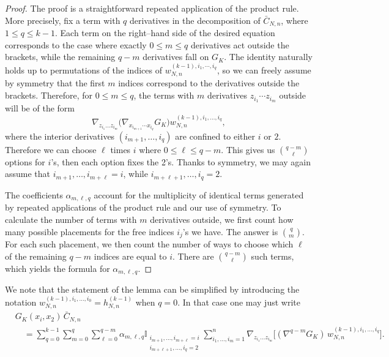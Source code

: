 \documentclass[pdflatex,sn-mathphys-num]{sn-jnl}
\theoremstyle{thmstyleone}%
\theoremstyle{thmstyletwo}%
\theoremstyle{thmstylethree}%
\begin{document}
\begin{proof}
The proof is a straightforward repeated application of the product rule.
More precisely, fix a term with \(q\) derivatives in the decomposition of \(\bar C_{N,n}\), where \(1\le q\le k-1\). Each term on the right--hand side of the desired equation corresponds to the case where exactly \(0\le m\le q\) derivatives act outside the brackets, while the remaining \(q-m\) derivatives fall on \(G_K\). The identity naturally holds up to permutations of the indices of
\(w_{N,n}^{(k-1),i_1,\cdots,i_q}\), so we can freely assume by symmetry that the first \(m\) indices correspond to the derivatives outside the brackets. Therefore, for \(0 \leq m \leq q\), the terms with \(m\) derivatives \(z_{i_{1}}\cdots z_{i_{m}}\) outside will be of the form
\[
\nabla_{z_{i_1}\dots z_{i_{m}}}\bigl(\nabla_{x_{i_{m+1}}\cdots x_{i_q}}G_K\bigr)
w_{N,n}^{(k-1),i_1,\dots,i_q},
\]
where the interior derivatives \((i_{m+1},\ldots,i_q)\) are confined to either \(i\) or \(2\). Therefore we can choose \(\ell\) times \(i\) where $0 \leq \ell \leq q-m$. This gives us $\binom{q-m}{\ell}$ options for $i$'s, then each option fixes the 2's. Thanks to symmetry, we may again assume that \(i_{m+1},\ldots,i_{m+\ell}=i\), while \(i_{m+\ell+1},\ldots,i_q=2\).

\noindent
The coefficients \(\alpha_{m,\ell,q}\) account for the multiplicity of identical terms generated by repeated applications of the product rule and our use of symmetry. To calculate the number of terms with \(m\) derivatives outside, we first count how many possible placements for the free indices \(i_j\)'s we have. The answer is \({q \choose m}\). For each such placement, we then count the number of ways to choose which \(\ell\) of the remaining \(q-m\) indices are equal to \(i\). There are \({q-m \choose \ell}\) such terms, which yields the formula for \(\alpha_{m,\ell,q}\).
\end{proof}
We note that the statement of the lemma can be simplified by introducing the notation $w^{(k-1),i_1,\ldots,i_0}_{N,n}=h_{N,n}^{(k-1)}$ when $q=0$. In that case one may just write     
%
\begin{align*}
& G_K(x_i,x_2)\,\bar{C}_{N,n}\\
&\quad =
\sum_{q=0}^{k-1} \sum_{m=0}^{q}\sum_{\ell=0}^{q-m} \alpha_{m,\ell,q} \mathbb{I}_{\substack{i_{m+1},\ldots, i_{m+\ell}=i \\ i_{m+\ell+1},\ldots,i_q=2}}
\sum_{i_1,\ldots,i_{m}=1}^{n} \nabla_{z_{i_1}\dots z_{i_{m}}}
\Big[
(\nabla^{q-m} G_K)\,
w_{N,n}^{(k-1),i_1,\ldots,i_{q}}
\Big].
\end{align*}
\end{document}
